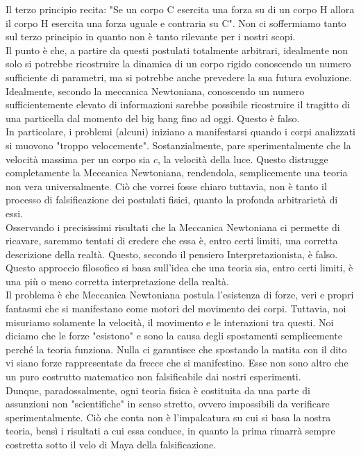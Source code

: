 \documentclass[]{scrbook}
\begin{document}
	Il terzo principio recita: "Se un corpo C esercita una forza su di un corpo H allora il corpo H esercita una forza uguale e contraria su C". Non ci soffermiamo tanto sul terzo principio in quanto non è tanto rilevante per i nostri scopi.\\
	Il punto è che, a partire da questi postulati totalmente arbitrari, idealmente non solo si potrebbe ricostruire la dinamica di un corpo rigido conoscendo un numero sufficiente di parametri, ma si potrebbe anche prevedere la sua futura evoluzione. Idealmente, secondo la meccanica Newtoniana, conoscendo un numero sufficientemente elevato di informazioni sarebbe possibile ricostruire il tragitto di una particella dal momento del big bang fino ad oggi. Questo è falso. \\
	In particolare, i problemi (alcuni) iniziano a manifestarsi quando i corpi analizzati si muovono "troppo velocemente". Sostanzialmente, pare sperimentalmente che la velocità massima per un corpo sia $c$, la velocità della luce. Questo distrugge completamente la Meccanica Newtoniana, rendendola, semplicemente una teoria non vera universalmente. Ciò che vorrei fosse chiaro tuttavia, non è tanto il processo di falsificazione dei postulati fisici, quanto la profonda arbitrarietà di essi.\\
	Osservando i precisissimi risultati che la Meccanica Newtoniana ci permette di ricavare, saremmo tentati di credere che essa è, entro certi limiti, una corretta descrizione della realtà. Questo, secondo il pensiero Interpretazionista, è falso. Questo approccio filosofico si basa sull'idea che una teoria sia, entro certi limiti, è una più o meno corretta interpretazione della realtà. 
	\\
	Il problema è che Meccanica Newtoniana postula l'esistenza di forze, veri e propri fantasmi che si manifestano come motori del movimento dei corpi. Tuttavia, noi misuriamo solamente la velocità, il movimento e le interazioni tra questi. Noi diciamo che le forze "esistono" e sono la causa degli spostamenti semplicemente perché la teoria funziona. Nulla ci garantisce che spostando la matita con il dito vi siano forze rappresentate da frecce che si manifestino. Esse non sono altro che un puro costrutto matematico non falsificabile dai nostri esperimenti.\\
	Dunque, paradossalmente, ogni teoria fisica è costituita da una parte di assunzioni non "scientifiche" in senso stretto, ovvero impossibili da verificare sperimentalmente. Ciò che conta non è l'impalcatura su cui si basa la nostra teoria, bensì i risultati a cui essa conduce, in quanto la prima rimarrà sempre costretta sotto il velo di Maya della falsificazione.\\
\end{document}
